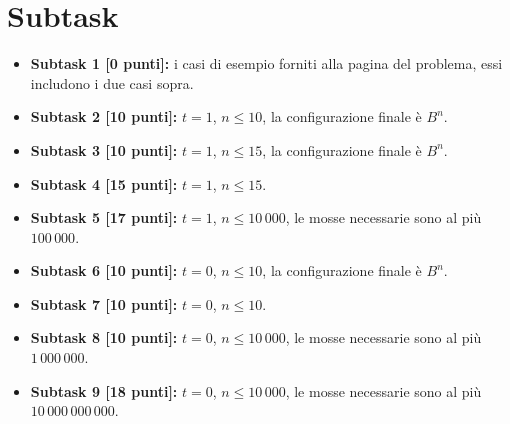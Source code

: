 \vspace{0.5cm}

\vspace{0.5cm}

  
\section*{Subtask}

  \begin{itemize}
    \item \textbf{Subtask 1 [0 punti]:} i casi di esempio forniti alla pagina del problema, essi includono i due casi sopra.
    \item \textbf{Subtask 2 [10 punti]:} $t=1$, $n \le 10$, la configurazione finale è $B^n$.
    \item \textbf{Subtask 3 [10 punti]:} $t=1$, $n \le 15$, la configurazione finale è $B^n$.
    \item \textbf{Subtask 4 [15 punti]:} $t=1$, $n \le 15$.
    \item \textbf{Subtask 5 [17 punti]:} $t=1$, $n \le 10\,000$, le mosse necessarie sono al più $100\,000$.
    \item \textbf{Subtask 6 [10 punti]:} $t=0$, $n \le 10$, la configurazione finale è $B^n$.
    \item \textbf{Subtask 7 [10 punti]:} $t=0$, $n \le 10$.
    \item \textbf{Subtask 8 [10 punti]:} $t=0$, $n \le 10\,000$, le mosse necessarie sono al più $1\,000\,000$.
    \item \textbf{Subtask 9 [18 punti]:} $t=0$, $n \le 10\,000$, le mosse necessarie sono al più $10\,000\,000\,000$.
  \end{itemize}
  
